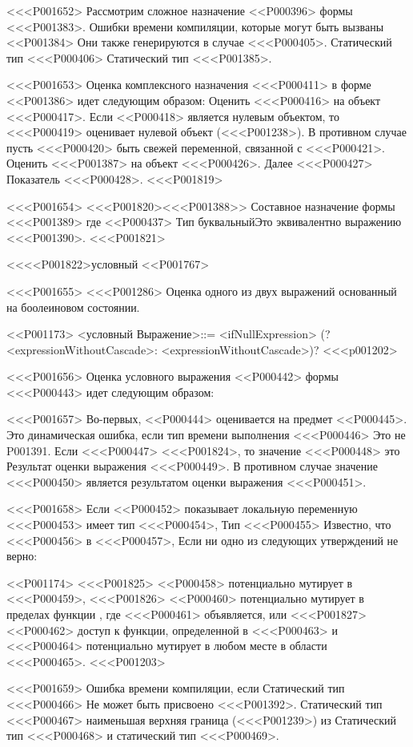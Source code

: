 {{{{{{{{<<<P001652>%
\Case{}
Рассмотрим сложное назначение <<P000396> формы <<<P001383>.
Ошибки времени компиляции, которые могут быть вызваны
<<P001384>
Они также генерируются в случае <<<P000405>.
Статический тип <<<P000406> Статический тип <<<P001385>.

<<<P001653>%
Оценка комплексного назначения <<<P000411> в форме
<<P001386>
идет следующим образом:
Оценить <<<P000416> на объект <<<P000417>.
Если <<P000418> является нулевым объектом, то <<<P000419> оценивает нулевой объект (<<<P001238>).
В противном случае пусть <<<P000420> быть свежей переменной, связанной с <<<P000421>.
Оценить <<<P001387> на объект <<<P000426>.
Далее <<<P000427> Показатель <<<P000428>.
<<<P001819>

<<<P001654>%
<<<P001820><<<P001388>>
Составное назначение формы <<<P001389>
где <<P000437> Тип буквальныйЭто эквивалентно выражению <<<P001390>.
<<<P001821>


<<<<P001822>{условный}
<<P001767>

<<<P001655>%
<<<P001286> Оценка одного из двух выражений
основанный на боолеиновом состоянии.

<<P001173>
<условный Выражение>::= <ifNullExpression>
\gnewline{} (?<expressionWithoutCascade>: <expressionWithoutCascade>)?
<<<p001202>

<<<P001656>%
Оценка условного выражения <<P000442> формы <<<P000443>
идет следующим образом:

<<<P001657>%
Во-первых, <<P000444> оценивается на предмет <<P000445>.
Это динамическая ошибка, если тип времени выполнения <<<P000446> Это не P001391.
Если <<<P000447> <<<P001824>, то значение <<<P000448> это
Результат оценки выражения <<<P000449>.
В противном случае значение <<<P000450> является результатом оценки выражения <<<P000451>.

<<<P001658>%
Если <<P000452> показывает локальную переменную <<<P000453> имеет тип <<<P000454>,
Тип <<<P000455> Известно, что <<<P000456> в <<<P000457>,
Если ни одно из следующих утверждений не верно:

<<P001174>
<<<P001825> <<P000458> потенциально мутирует в <<<P000459>,
<<<P001826> <<P000460> потенциально мутирует в пределах функции
, где <<<P000461> объявляется, или
<<<P001827> <<P000462> доступ к функции, определенной в <<<P000463> и
<<<P000464> потенциально мутирует в любом месте в области <<<P000465>.
<<<P001203>

<<<P001659>%
Ошибка времени компиляции, если
Статический тип <<<P000466> Не может быть присвоено <<<P001392>.
Статический тип <<<P000467> наименьшая верхняя граница (<<<P001239>) из
Статический тип <<<P000468> и статический тип <<<P000469>.


}}}}}}}}
